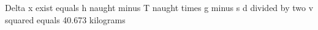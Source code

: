 Delta x exist equals h naught minus T naught times g minus s d divided by two v squared equals 40.673 kilograms